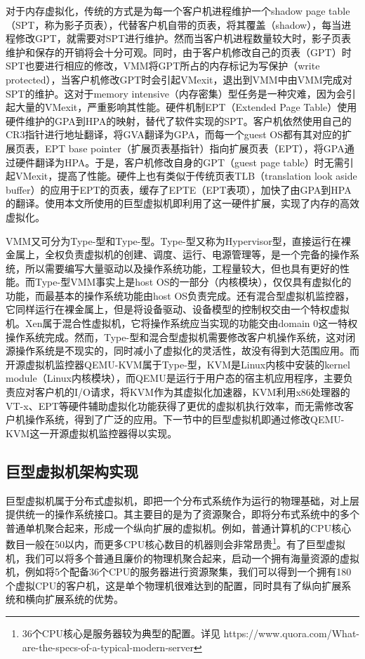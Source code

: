 对于内存虚拟化，传统的方式是为每一个客户机进程维护一个shadow page table（SPT，称为影子页表），代替客户机自带的页表，将其覆盖（shadow），每当进程修改GPT，就需要对SPT进行维护。然而当客户机进程数量较大时，影子页表维护和保存的开销将会十分可观。同时，由于客户机修改自己的页表（GPT）时SPT也要进行相应的修改，VMM将GPT所占的内存标记为写保护（write protected），当客户机修改GPT时会引起VMexit，退出到VMM中由VMM完成对SPT的维护。这对于memory intensive（内存密集）型任务是一种灾难，因为会引起大量的VMexit，严重影响其性能。硬件机制EPT（Extended Page Table）使用硬件维护的GPA到HPA的映射，替代了软件实现的SPT。客户机依然使用自己的CR3指针进行地址翻译，将GVA翻译为GPA，而每一个guest OS都有其对应的扩展页表，EPT base pointer（扩展页表基指针）指向扩展页表（EPT），将GPA通过硬件翻译为HPA。于是，客户机修改自身的GPT（guest page table）时无需引起VMexit，提高了性能。硬件上也有类似于传统页表TLB（translation look aside buffer）的应用于EPT的页表，缓存了EPTE（EPT表项），加快了由GPA到HPA的翻译。使用本文所使用的巨型虚拟机即利用了这一硬件扩展，实现了内存的高效虚拟化。

VMM又可分为Type-\uppercase\expandafter{}型和Type-\uppercase\expandafter{}型。Type-\uppercase\expandafter{}型又称为Hypervisor型，直接运行在裸金属上，全权负责虚拟机的创建、调度、运行、电源管理等，是一个完备的操作系统，所以需要编写大量驱动以及操作系统功能，工程量较大，但也具有更好的性能。而Type-\uppercase\expandafter{}型VMM事实上是host OS的一部分（内核模块），仅仅具有虚拟化的功能，而最基本的操作系统功能由host OS负责完成。还有混合型虚拟机监控器，它同样运行在裸金属上，但是将设备驱动、设备模型的控制权交由一个特权虚拟机。Xen属于混合性虚拟机，它将操作系统应当实现的功能交由domain 0这一特权操作系统完成。然而，Type-\uppercase\expandafter{}型和混合型虚拟机需要修改客户机操作系统，这对闭源操作系统是不现实的，同时减小了虚拟化的灵活性，故没有得到大范围应用。而开源虚拟机监控器QEMU-KVM属于Type-\uppercase\expandafter{}型，KVM\cite{KVM}是Linux内核中安装的kernel module（Linux内核模块），而QEMU\cite{QEMU}是运行于用户态的宿主机应用程序，主要负责应对客户机的I/O请求，将KVM作为其虚拟化加速器，KVM利用x86处理器的VT-x、EPT等硬件辅助虚拟化功能获得了更优的虚拟机执行效率，而无需修改客户机操作系统，得到了广泛的应用。下一节中的巨型虚拟机即通过修改QEMU-KVM这一开源虚拟机监控器得以实现。
\subsection{巨型虚拟机架构实现}
巨型虚拟机属于分布式虚拟机，即把一个分布式系统作为运行的物理基础，对上层提供统一的操作系统接口。其主要目的是为了资源聚合，即将分布式系统中的多个普通单机聚合起来，形成一个纵向扩展的虚拟机。例如，普通计算机的CPU核心数目一般在50以内，而更多CPU核心数目的机器则会非常昂贵\footnote{36个CPU核心是服务器较为典型的配置。详见 https://www.quora.com/What-are-the-specs-of-a-typical-modern-server}。有了巨型虚拟机，我们可以将多个普通且廉价的物理机聚合起来，启动一个拥有海量资源的虚拟机，例如将5个配备36个CPU的服务器进行资源聚集，我们可以得到一个拥有180个虚拟CPU的客户机，这是单个物理机很难达到的配置，同时具有了纵向扩展系统和横向扩展系统的优势。

